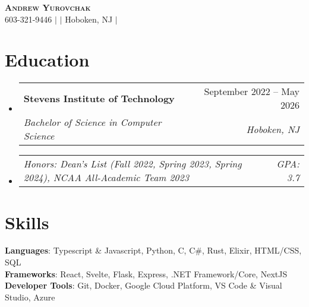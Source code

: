 \documentclass[letterpaper,11pt]{article}
\makeatletter
\newcommand{\resumeSubheading}[4]{
  \vspace{-2pt}\item
    \begin{tabular*}{0.97\textwidth}[t]{l@{\extracolsep{\fill}}r}
      \textbf{#1} & #2 \\
      \textit{\small#3} & \textit{\small #4} \\
    \end{tabular*}\vspace{-7pt}
}
\newcommand{\resumeSubSubheading}[2]{
    \item
    \begin{tabular*}{0.97\textwidth}{l@{\extracolsep{\fill}}r}
      \textit{\small#1} & \textit{\small #2} \\
    \end{tabular*}\vspace{-7pt}
}
\newcommand{\resumeSubHeadingListStart}{\begin{itemize}[leftmargin=0.15in, label={}]}
\newcommand{\resumeSubHeadingListEnd}{\end{itemize}}
\makeatother
\begin{document}

\begin{center}
    \textbf{\Huge \scshape Andrew Yurovchak} \\ \vspace{3pt}
    \small 603-321-9446 $|$ \href{mailto:andy@yurovchak.net}{\underline{}} $|$ \small{Hoboken, NJ} $|$
    \href{https://portfolio.baetylboy.biz}{\underline{}} \\ \vspace{-3pt}
\end{center}


\section{Education}
  \resumeSubHeadingListStart
    \resumeSubheading
      {Stevens Institute of Technology}{September 2022 -- May 2026}
      {Bachelor of Science in Computer Science}{Hoboken, NJ}
    \resumeSubSubheading{Honors: Dean's List (Fall 2022, Spring 2023, Spring 2024), NCAA All-Academic Team 2023}{GPA: 3.7}
  \resumeSubHeadingListEnd


\section{Skills}
 \begin{itemize}[leftmargin=0.15in, label={}]
    \small{\item{
     \textbf{Languages}{: Typescript \& Javascript, Python, C, C\#, Rust, Elixir, HTML/CSS, SQL} \\
     \textbf{Frameworks}{: React, Svelte, Flask, Express, .NET Framework/Core, NextJS} \\
     \textbf{Developer Tools}{: Git, Docker, Google Cloud Platform, VS Code \& Visual Studio, Azure}
    }}
 \end{itemize}

\end{document}
